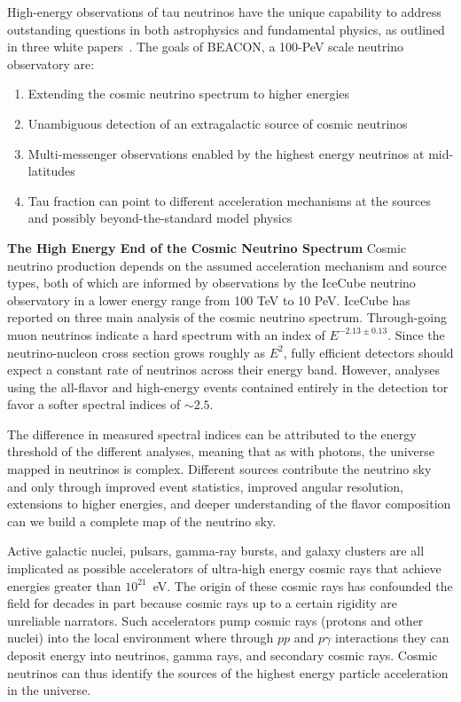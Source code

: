\documentclass[12pt]{article}
\begin{document}
High-energy observations of tau neutrinos have the unique capability to address outstanding questions in both astrophysics and fundamental physics, as outlined in three white papers~\cite{Astro2020_fundamental, Astro2020_astrophysics, Astro2020_blazars}. The goals of BEACON, a 100-PeV scale neutrino observatory are:
\begin{enumerate}
	\item Extending the cosmic neutrino spectrum to higher energies	\item Unambiguous detection of an extragalactic source of cosmic neutrinos
 	\item Multi-messenger observations enabled by the highest energy neutrinos at mid-latitudes
	\item Tau fraction can point to different acceleration mechanisms at the sources and possibly beyond-the-standard model physics
\end{enumerate}

\textbf{The High Energy End of the Cosmic Neutrino Spectrum} Cosmic neutrino production depends on the assumed acceleration mechanism and source types, both of which are informed by observations by the IceCube neutrino observatory in a lower energy range from 100 TeV to 10 PeV. IceCube has reported on three main analysis of the cosmic neutrino spectrum. Through-going muon neutrinos indicate a hard spectrum with an index of $E^{-2.13\pm0.13}$. Since the neutrino-nucleon cross section grows roughly as $E^{2}$, fully efficient detectors should expect a constant rate of neutrinos across their energy band. However, analyses using the all-flavor and high-energy events contained entirely in the detection tor favor a softer spectral indices of $\sim2.5$. 

The difference in measured spectral indices can be attributed to the energy threshold of the different analyses, meaning that as with photons, the universe mapped in neutrinos is complex. Different sources contribute the neutrino sky and only through improved event statistics, improved angular resolution, extensions to higher energies, and deeper understanding of the flavor composition can we build a complete map of the neutrino sky. 


Active galactic nuclei, pulsars, gamma-ray bursts, and galaxy clusters are all implicated as possible accelerators of ultra-high energy cosmic rays that achieve energies greater than $10^{21}$~eV. The origin of these cosmic rays has confounded the field for decades in part because cosmic rays up to a certain rigidity are unreliable narrators. Such accelerators pump cosmic rays (protons and other nuclei) into the local environment where through $pp$ and $p\gamma$ interactions they can deposit energy into neutrinos, gamma rays, and secondary cosmic rays. Cosmic neutrinos can thus identify the sources of the highest energy particle acceleration in the universe.
\end{document}
